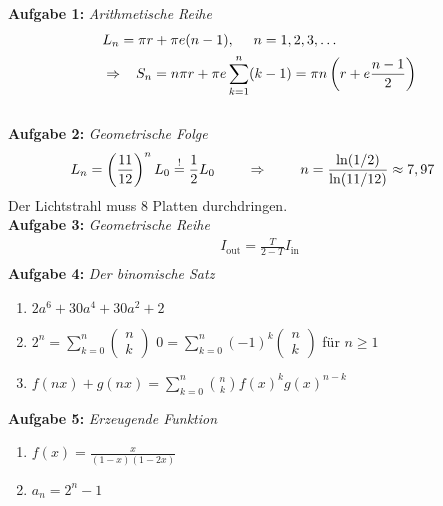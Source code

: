 
\textbf{Aufgabe 1: } \emph{Arithmetische Reihe}
\begin{align*}
&L_n=\pi r+\pi e(n-1),\ \ \ \ n=1,2,3,\dots \\
&\Rightarrow\hspace{0.3cm}S_n=n\pi r+\pi e\sum\limits_{k=1}^n(k-1)=\pi n\left(r+e\frac{n-1}{2}\right)
\end{align*}\\[0.5cm]
%
\textbf{Aufgabe 2: } \emph{Geometrische Folge}
\begin{align*}
& L_n=\left(\frac{11}{12}\right)^nL_0\stackrel{!}{=}\frac{1}{2}L_0 \hspace{0.8cm} \Rightarrow\hspace{0.8cm}n=\frac{\ln(1/2)}{\ln(11/12)}\approx 7,97
\end{align*}
Der Lichtstrahl muss 8 Platten durchdringen.\\[1.2cm]
%
\textbf{Aufgabe 3: } \emph{Geometrische Reihe}
\begin{align*}
I_\text{out}=\frac{T}{2-T}I_\text{in}\\[0.2cm]
\end{align*}
%
\textbf{Aufgabe 4: } \emph{Der binomische Satz}
\begin{enumerate}[label=(\alph*)]
\item $2a^6+30a^4+30a^2+2$
\item $2^n=\sum\limits_{k=0}^n\begin{pmatrix}n\\k\end{pmatrix}$\hspace{0.2cm}\hspace{0.2cm} $0=\sum\limits_{k=0}^n(-1)^k\begin{pmatrix}n\\k\end{pmatrix}$ für $n\ge 1$
\item $f(nx)+g(nx)=\sum\limits_{k=0}^n\binom{n}{k}f(x)^kg(x)^{n-k}$
\end{enumerate}
\vspace{1cm}
%
\textbf{Aufgabe 5: } \emph{Erzeugende Funktion}
\begin{enumerate}
\item $f(x)=\frac{x}{(1-x)(1-2x)}$
\item $a_n=2^n-1$\\[0.2cm]
\end{enumerate}
%
